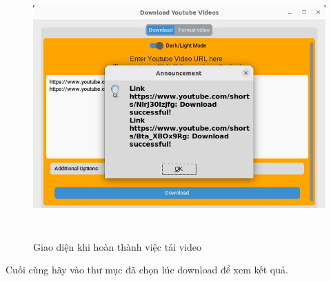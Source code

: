 \documentclass{article} %
\begin{document}
\begin{figure}[H]
    \centering
    \includegraphics[width=15cm, height=10cm]{images/tienhanh3.PNG}
    \caption{Giao diện khi hoàn thành việc tải video}
    \label{fig:enter-label}
\end{figure}
Cuối cùng hãy vào thư mục đã chọn lúc download để xem kết quả.
\end{document}
